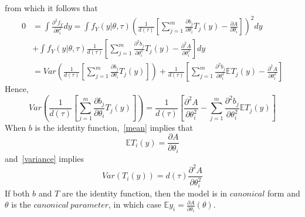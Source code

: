 \documentclass[11pt]{article}
\begin{document}
from which it follows that
\begin{equation}
\begin{split}
0 & = \int \frac{\partial^2 f_Y}{\partial \theta_i^2} dy = \int f_Y \left( y | \theta, \tau \right) \left( \frac{1}{d \left( \tau \right)} \left[ \sum_{j=1}^m \frac{\partial b_j}{\partial \theta_i} T_j \left( y \right) - \frac{\partial A}{\partial \theta_i} \right] \right)^2 dy \\
& + \int f_Y \left( y | \theta, \tau \right) \frac{1}{d \left( \tau \right)} \left[ \sum_{j=1}^m \frac{\partial^2 b_j}{\partial \theta_i^2} T_j \left( y \right) - \frac{\partial^2 A}{\partial \theta_i^2} \right] dy \\
& = Var \left( \frac{1}{d \left( \tau \right)} \left[ \sum_{j=1}^m \frac{\partial b_j}{\partial \theta_i} T_j \left( y \right) \right] \right) + \frac{1}{d \left( \tau \right)} \left[ \sum_{j=1}^m \frac{\partial^2 b_j}{\partial \theta_i^2} \mathbb{E} T_j \left( y \right) - \frac{\partial^2 A}{\partial \theta_i^2} \right]
\end{split}
\end{equation}
Hence,
\begin{equation} \label{variance}
Var \left( \frac{1}{d \left( \tau \right)} \left[ \sum_{j=1}^m \frac{\partial b_j}{\partial \theta_i} T_j \left( y \right) \right] \right) = \frac{1}{d \left( \tau \right)} \left[ \frac{\partial^2 A}{\partial \theta_i^2} - \sum_{j=1}^m \frac{\partial^2 b_j}{\partial \theta_i^2} \mathbb{E} T_j \left( y \right) \right]
\end{equation}
When $b$ is the identity function,~\eqref{mean} implies that
\begin{equation}
\mathbb{E} T_i \left( y \right) = \frac{\partial A}{\partial \theta_i}
\end{equation}
and~\eqref{variance} implies
\begin{equation}
Var \left( T_i \left( y \right) \right) = d \left( \tau \right) \frac{\partial^2 A}{\partial \theta_i^2}
\end{equation}
If both $b$ and $T$ are the identity function, then the model is in $canonical$ form and $\theta$ is the $canonical\ parameter$, in which case $\mathbb{E} y_i = \frac{\partial A}{\partial \theta_i} \left( \theta \right)$.
\end{document}
